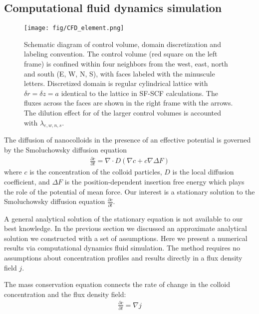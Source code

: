 \documentclass[10pt, a4paper]{article}
\begin{document}
\pagebreak

\subsection*{Computational fluid dynamics simulation}

\begin{multicols}{2}
\begin{figure}[H]
    \centering
    \texttt{[image: fig/CFD\_element.png]}
    \caption{
        Schematic diagram of control volume, domain discretization and labeling convention.
        The control volume (red square on the left frame) is confined within four neighbors from the west, east, north and south (E, W, N, S), with faces labeled with the minuscule letters.
        Discretized domain is regular cylindrical lattice with $\delta r = \delta z = a$ identical to the lattice in SF-SCF calculations.
        The fluxes across the faces are shown in the right frame with the arrows.
        The dilution effect for of the larger control volumes is accounted with $\lambda_{e,w,n,s}$.
        }
    \label{fig:CFD_element}
\end{figure}

The diffusion of nanocolloids in the presence of an effective potential is governed by the Smoluchowsky diffusion equation
\begin{eqnarray}
    \frac{\partial c}{\partial t} = \nabla \cdot D(\nabla c + c \nabla \Delta F)
\end{eqnarray} where $c$ is the concentration of the colloid particles,
$D$ is the local diffusion coefficient, and $\Delta F$ is the position-dependent insertion free energy which plays the role of the potential of mean force.
Our interest is a stationary solution to the Smoluchowsky diffusion equation $\frac{\partial c}{\partial t}$.

A general analytical solution of the stationary equation is not available to our best knowledge. 
In the previous section we discussed an approximate analytical solution we constructed with a set of assumptions.
Here we present a numerical results via computational dynamics fluid simulation.
The method requires no assumptions about concentration profiles and results directly in a flux density field $j$.

The mass conservation equation connects the rate of change in the colloid concentration and the flux density field:
\begin{eqnarray}
    \frac{\partial c}{\partial t} = \nabla j
\end{eqnarray}


\end{multicols}
\end{document}
